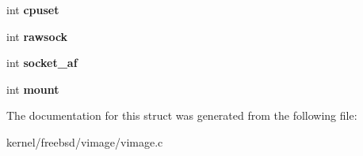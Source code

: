 \begin{DoxyCompactItemize}
\item 
\hypertarget{structvimage__status_ae33252a93c876a9eb8ed7df24b620a6e}{int {\bfseries cpuset}}\label{structvimage__status_ae33252a93c876a9eb8ed7df24b620a6e}

\item 
\hypertarget{structvimage__status_a49cd0c4f0384abaa664dd573fa0e98e6}{int {\bfseries rawsock}}\label{structvimage__status_a49cd0c4f0384abaa664dd573fa0e98e6}

\item 
\hypertarget{structvimage__status_afcc5cc582934f141b97ce071e5602d7a}{int {\bfseries socket\+\_\+af}}\label{structvimage__status_afcc5cc582934f141b97ce071e5602d7a}

\item 
\hypertarget{structvimage__status_a050085096f2ee3a556dac86666406781}{int {\bfseries mount}}\label{structvimage__status_a050085096f2ee3a556dac86666406781}

\end{DoxyCompactItemize}


The documentation for this struct was generated from the following file\+:\begin{DoxyCompactItemize}
\item 
kernel/freebsd/vimage/vimage.\+c\end{DoxyCompactItemize}
